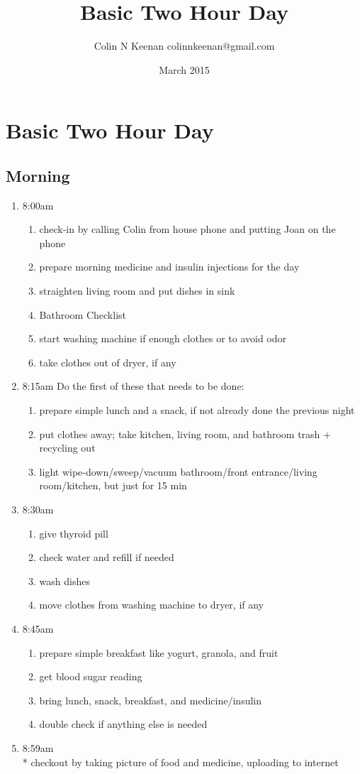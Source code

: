 \documentclass[12pt,letterpaper]{article}
\newcommand{\mytitle}{Basic Two Hour Day}
\begin{document}
\title{\mytitle{}}
\author{Colin N Keenan colinnkeenan@gmail.com}
\date{March 2015}
\section*{\mytitle{}}
\begin{multicols}{2} 
\subsection*{Morning}
\begin{enumerate}
	\item 8:00am
		\begin{enumerate}
			\item check-in by calling Colin from house phone and putting Joan on the phone
			\item prepare morning medicine and insulin injections for the day
			\item straighten living room and put dishes in sink
			\item Bathroom Checklist
			\item start washing machine if enough clothes or to avoid odor
			\item take clothes out of dryer, if any
		\end{enumerate}
	\item 8:15am
		Do the first of these that needs to be done:
		\begin{enumerate}
			\item prepare simple lunch and a snack, if not already done the previous night
			\item put clothes away; take kitchen, living room, and bathroom trash + recycling out
			\item light wipe-down/sweep/vacuum bathroom/front entrance/living room/kitchen, but just for 15 min
		\end{enumerate}
	\item 8:30am
		\begin{enumerate}
			\item give thyroid pill
			\item check water and refill if needed
			\item wash dishes
			\item move clothes from washing machine to dryer, if any
		\end{enumerate}
	\item 8:45am
		\begin{enumerate}
			\item prepare simple breakfast like yogurt, granola, and fruit
			\item get blood sugar reading
			\item bring lunch, snack, breakfast, and medicine/insulin
			\item double check if anything else is needed
		\end{enumerate}
	\item 8:59am \\*
		checkout by taking picture of food and medicine, uploading to internet
\end{enumerate}


\end{multicols}
\end{document}
